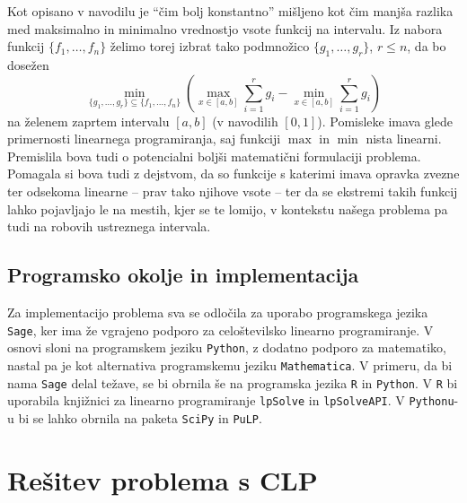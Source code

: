 \documentclass[11pt]{article}
\theoremstyle{definition}
\newcommand{\1}{\mathbbm{1}}
\newcommand{\set}[1]{\{#1\}}
\begin{document}
\noindent Kot opisano v navodilu je ``čim bolj konstantno'' mišljeno kot čim manjša razlika med maksimalno in minimalno vrednostjo vsote funkcij na intervalu. Iz nabora funkcij $\set{f_1,\ldots,f_n}$ želimo torej izbrat tako podmnožico $\set{g_1,\ldots,g_r}$, $r \leq n$, da bo dosežen
$$\min_{\set{g_1,\ldots,g_r} \subseteq \set{f_1,\ldots,f_n}}\left({\max_{x \in [a,b]}\sum_{i=1}^r g_i - \min_{x \in [a,b]}\sum_{i=1}^r g_i}\right)$$
na želenem zaprtem intervalu $[a,b]$ (v navodilih $[0,1]$). Pomisleke imava glede primernosti linearnega programiranja, saj funkciji $\max$ in $\min$ nista linearni. Premislila bova tudi o potencialni boljši matematični formulaciji problema. Pomagala si bova tudi z dejstvom, da so funkcije s katerimi imava opravka zvezne ter odsekoma linearne -- prav tako njihove vsote -- ter da se ekstremi takih funkcij lahko pojavljajo le na mestih, kjer se te lomijo, v kontekstu našega problema pa tudi na robovih ustreznega intervala.

\subsection{Programsko okolje in implementacija}
\vspace{0.5cm}

Za implementacijo problema sva se odločila za uporabo programskega jezika \texttt{Sage}, ker ima že vgrajeno podporo za celoštevilsko linearno programiranje. V osnovi sloni na programskem jeziku \texttt{Python}, z dodatno podporo za matematiko, nastal pa je kot alternativa programskemu jeziku \texttt{Mathematica}. V primeru, da bi nama \texttt{Sage} delal težave, se bi obrnila še na programska jezika \texttt{R} in \texttt{Python}. V \texttt{R} bi uporabila knjižnici za linearno programiranje \texttt{lpSolve} in \texttt{lpSolveAPI}. V \texttt{Pythonu}-u bi se lahko obrnila na paketa \texttt{SciPy} in \texttt{PuLP}.


\section{Rešitev problema s CLP}
\vspace{0.5cm}
\end{document}
